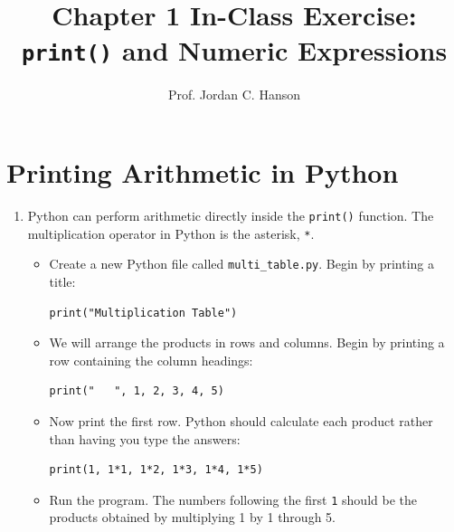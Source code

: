 \documentclass{article}
\begin{document}
\twocolumn

\title{Chapter 1 In-Class Exercise: \texttt{print()} and Numeric Expressions}
\author{Prof. Jordan C. Hanson}

\maketitle

\section{Printing Arithmetic in Python}

\begin{enumerate}
\item Python can perform arithmetic directly inside the \texttt{print()} function.  The multiplication operator in Python is the asterisk, \texttt{*}.
\begin{itemize}

\item Create a new Python file called \texttt{multi\_table.py}.  Begin by printing a title:
\begin{verbatim}
print("Multiplication Table")
\end{verbatim}
\vspace{0.25cm}

\item We will arrange the products in rows and columns.  Begin by printing a row containing the column headings:
\begin{verbatim}
print("   ", 1, 2, 3, 4, 5)
\end{verbatim}
\vspace{0.25cm}

\item Now print the first row.  Python should calculate each product rather than having you type the answers:
\begin{verbatim}
print(1, 1*1, 1*2, 1*3, 1*4, 1*5)
\end{verbatim}
\vspace{0.25cm}

\item Run the program.  The numbers following the first \texttt{1} should be the products obtained by multiplying 1 by  1 through 5. \\ \vspace{0.25cm}

\end{itemize}
\end{enumerate}
\end{document}
